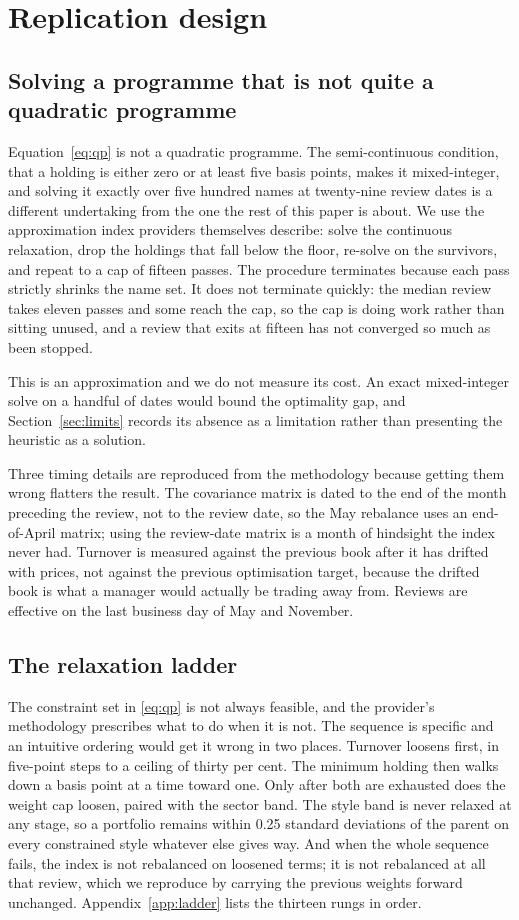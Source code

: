 \section{Replication design}
\label{sec:design}

\subsection{Solving a programme that is not quite a quadratic programme}
Equation~\eqref{eq:qp} is not a quadratic programme. The semi-continuous
condition, that a holding is either zero or at least five basis points, makes
it mixed-integer, and solving it exactly over five hundred names at
twenty-nine review dates is a different undertaking from the one the rest of
this paper is about. We use the approximation index providers themselves
describe: solve the continuous relaxation, drop the holdings that fall below
the floor, re-solve on the survivors, and repeat to a cap of fifteen passes. The
procedure terminates because each pass strictly shrinks the name set. It does
not terminate quickly: the median review takes eleven passes and some reach the
cap, so the cap is doing work rather than sitting unused, and a review that
exits at fifteen has not converged so much as been stopped.

This is an approximation and we do not measure its cost. An exact mixed-integer
solve on a handful of dates would bound the optimality gap, and
Section~\ref{sec:limits} records its absence as a limitation rather than
presenting the heuristic as a solution.

Three timing details are reproduced from the methodology because getting them
wrong flatters the result. The covariance matrix is dated to the end of the
month preceding the review, not to the review date, so the May rebalance uses
an end-of-April matrix; using the review-date matrix is a month of hindsight
the index never had. Turnover is measured against the previous book after it
has drifted with prices, not against the previous optimisation target, because
the drifted book is what a manager would actually be trading away from.
Reviews are effective on the last business day of May and November.

\subsection{The relaxation ladder}
The constraint set in \eqref{eq:qp} is not always feasible, and the provider's
methodology prescribes what to do when it is not. The sequence is specific and
an intuitive ordering would get it wrong in two places. Turnover loosens first,
in five-point steps to a ceiling of thirty per cent. The minimum holding then
walks down a basis point at a time toward one. Only after both are exhausted
does the weight cap loosen, paired with the sector band. The style band is
never relaxed at any stage, so a portfolio remains within 0.25 standard
deviations of the parent on every constrained style whatever else gives way.
And when the whole sequence fails, the index is not rebalanced on loosened
terms; it is not rebalanced at all that review, which we reproduce by carrying
the previous weights forward unchanged. Appendix~\ref{app:ladder} lists the
thirteen rungs in order.


